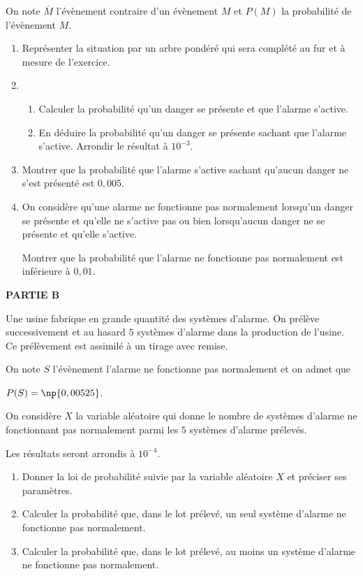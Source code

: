\documentclass[10pt,a4paper]{article}
\begin{document}
On note $\overline{M}$ l'évènement contraire d'un évènement $M$ et $P(M)$ la probabilité de l'évènement $M$.

\medskip

\begin{enumerate}
\item Représenter la situation par un arbre pondéré qui sera complété au fur et à mesure de l'exercice.
\item  
	\begin{enumerate}
		\item Calculer la probabilité qu'un danger se présente et que l'alarme s'active.
		\item En déduire la probabilité qu'un danger se présente sachant que l'alarme s'active.
Arrondir le résultat à $10^{-3}$.
	\end{enumerate}
\item  Montrer que la probabilité que l'alarme s'active sachant qu'aucun danger ne s'est présenté est $0,005$.
\item On considère qu'une alarme ne fonctionne pas normalement lorsqu'un danger se présente et qu'elle ne s'active pas ou bien lorsqu'aucun danger ne se présente et qu'elle s'active.

Montrer que la probabilité que l'alarme ne fonctionne pas normalement est inférieure à $0,01$.
\end{enumerate}

\medskip

\textbf{PARTIE B}

\medskip

Une usine fabrique en grande quantité des systèmes d'alarme. On prélève successivement et au hasard $5$ systèmes d'alarme dans la production de l'usine. Ce prélèvement est assimilé à un tirage avec remise.

On note $S$ l'évènement \og  l'alarme ne fonctionne pas normalement \fg{}  et on admet que

$P(S) = \np{0,00525}$.

On considère $X$ la variable aléatoire qui donne le nombre de systèmes d'alarme ne fonctionnant pas normalement parmi les $5$ systèmes d'alarme prélevés.

Les résultats seront arrondis à $10^{-4}$.

\medskip

\begin{enumerate}
\item Donner la loi de probabilité suivie par la variable aléatoire $X$ et préciser ses paramètres.
\item Calculer la probabilité que, dans le lot prélevé, un seul système d'alarme ne fonctionne pas normalement.
\item Calculer la probabilité que, dans le lot prélevé, au moins un système d'alarme ne fonctionne pas normalement.
\end{enumerate}
\end{document}
